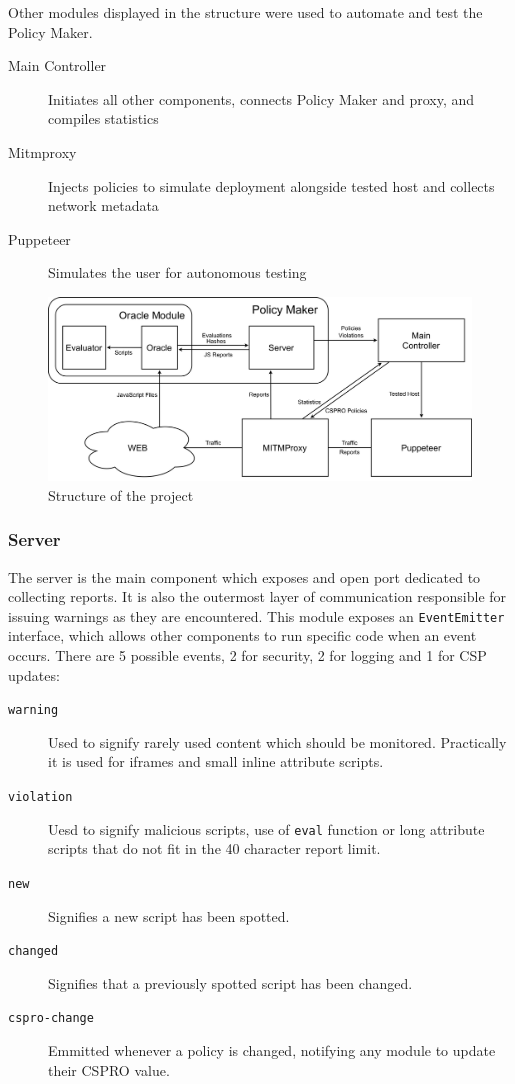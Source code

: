 \begin{description}
\begin{description}
Other modules displayed in the structure were used to automate and test the Policy Maker.
\begin{description}
	\item[Main Controller] Initiates all other components, connects Policy Maker and proxy, and compiles statistics
	\item[Mitmproxy] Injects policies to simulate deployment alongside tested host and collects network metadata
	\item[Puppeteer] Simulates the user for autonomous testing
\end{description}

\begin{figure}[H]
	\centering
	\includegraphics[width=\textwidth]{imgs/project_structure.png}
	\caption{Structure of the project}
	\label{structure}
\end{figure}

\subsubsection{Server}
The server is the main component which exposes and open port dedicated to collecting reports.
It is also the outermost layer of communication responsible for issuing warnings as they are encountered.
This module exposes an \texttt{EventEmitter} interface, which allows other components to run specific code when an event occurs.
There are 5 possible events, 2 for security, 2 for logging and 1 for CSP updates:
\begin{description}
	\item[\texttt{warning}]	Used to signify rarely used content which should be monitored. Practically it is used for iframes and small inline attribute scripts. 
	\item[\texttt{violation}] Uesd to signify malicious scripts, use of \texttt{eval} function or long attribute scripts that do not fit in the 40 character report limit.
	\item[\texttt{new}] Signifies a new script has been spotted.
	\item[\texttt{changed}] Signifies that a previously spotted script has been changed.
	\item[\texttt{cspro-change}] Emmitted whenever a policy is changed, notifying any module to update their CSPRO value.
\end{description}


\end{description}
\end{description}
